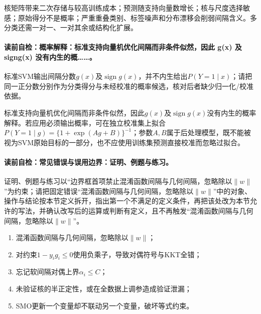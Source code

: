 \begin{notapplicablebox}[title=\SLMethodLimitationsTitle]
核矩阵带来二次存储与较高训练成本；预测随支持向量数增长；核与尺度选择敏感；原始得分不是概率；严重重叠类别、标签噪声和分布漂移会削弱间隔含义。多分类还需一对一、一对其余或结构化扩展。
\end{notapplicablebox}

\paragraph{读前自检：概率解释：标准支持向量机优化间隔而非条件似然，因此 g(x) 及 signg(x) 没有内生的概……。}标准SVM输出间隔分数$g(x)$及$\operatorname{sign}g(x)$，并不内生给出$P(Y=1\mid x)$；请把同一正分数分别作为分类得分与未经校准的概率候选，核对后者缺少归一化/校准依据。\par

\begin{probabilitybox}
标准支持向量机优化间隔而非条件似然，因此$g(x)$及$\operatorname{sign}g(x)$没有内生的概率解释。若应用必须输出概率，可在独立校准集上拟合$P(Y=1\mid g)=\{1+\exp(Ag+B)\}^{-1}$；参数$A,B$属于后处理模型，既不能被视为SVM原始目标的一部分，也不应使用训练集预测直接校准而忽略过拟合。
\end{probabilitybox}

\label{struct:V3-C02-CH30}
\paragraph{读前自检：常见错误与误用边界：证明、例题与练习。}证明、例题与练习以“边界框首项禁止混淆函数间隔与几何间隔，忽略除以$\lVert w\rVert$”为约束；请把固定错误“混淆函数间隔与几何间隔，忽略除以$\lVert w\rVert$”中的对象、操作与结论按本节定义拆开，指出第一个不满足的定义条件，再把该处改为本节允许的写法，并确认改写后的运算或判断有定义，且不再触发“混淆函数间隔与几何间隔，忽略除以$\lVert w\rVert$”。\par

\begin{warningbox}
\begin{enumerate}[leftmargin=2.2em]
  \item 混淆函数间隔与几何间隔，忽略除以$\lVert w\rVert$；
  \item 对约束$1-y_ig_i\leq0$使用负乘子，导致对偶符号与KKT全错；
  \item 忘记软间隔对偶上界$\alpha_i\leq C$；
  \item 未验证核的半正定性，或在全数据上调参造成验证泄漏；
  \item SMO更新一个变量却不联动另一个变量，破坏等式约束。
\end{enumerate}
\end{warningbox}

